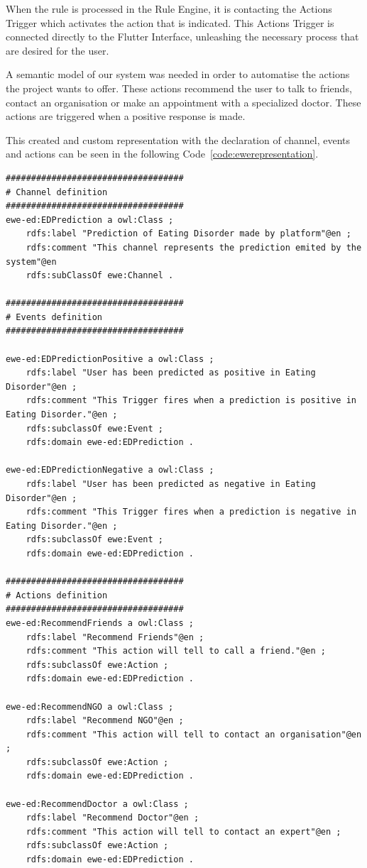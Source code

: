 When the rule is processed in the Rule Engine, it is contacting the Actions Trigger which activates the action that is indicated. This Actions Trigger is connected directly to the Flutter Interface, unleashing the necessary process that are desired for the user.


A semantic model of our system was needed in order to automatise the actions the project wants to offer. These actions recommend the user to talk to friends, contact an organisation or make an appointment with a specialized doctor. These actions are triggered when a positive response is made.


This created and custom representation with the declaration of channel, events and actions can be seen in the following Code~\ref{code:ewerepresentation}.

\begin{lstlisting}[label={code:ewerepresentation}, caption={Custom semantic representation implemented.}]
###################################
# Channel definition
###################################
ewe-ed:EDPrediction a owl:Class ;    
    rdfs:label "Prediction of Eating Disorder made by platform"@en ;
    rdfs:comment "This channel represents the prediction emited by the system"@en
    rdfs:subClassOf ewe:Channel .

###################################
# Events definition
###################################

ewe-ed:EDPredictionPositive a owl:Class ;
    rdfs:label "User has been predicted as positive in Eating Disorder"@en ;
    rdfs:comment "This Trigger fires when a prediction is positive in Eating Disorder."@en ;
    rdfs:subclassOf ewe:Event ;
    rdfs:domain ewe-ed:EDPrediction .

ewe-ed:EDPredictionNegative a owl:Class ;
    rdfs:label "User has been predicted as negative in Eating Disorder"@en ;
    rdfs:comment "This Trigger fires when a prediction is negative in Eating Disorder."@en ;
    rdfs:subclassOf ewe:Event ;
    rdfs:domain ewe-ed:EDPrediction .

###################################
# Actions definition
###################################
ewe-ed:RecommendFriends a owl:Class ;
    rdfs:label "Recommend Friends"@en ;
    rdfs:comment "This action will tell to call a friend."@en ;
    rdfs:subclassOf ewe:Action ;
    rdfs:domain ewe-ed:EDPrediction .

ewe-ed:RecommendNGO a owl:Class ;
    rdfs:label "Recommend NGO"@en ;
    rdfs:comment "This action will tell to contact an organisation"@en ;
    rdfs:subclassOf ewe:Action ;
    rdfs:domain ewe-ed:EDPrediction .

ewe-ed:RecommendDoctor a owl:Class ;
    rdfs:label "Recommend Doctor"@en ;
    rdfs:comment "This action will tell to contact an expert"@en ;
    rdfs:subclassOf ewe:Action ;
    rdfs:domain ewe-ed:EDPrediction .

\end{lstlisting}

